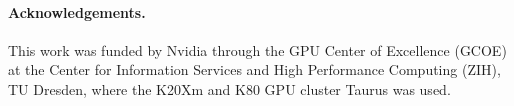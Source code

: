 
\paragraph{Acknowledgements.} This work was funded by Nvidia through the GPU Center of Excellence (GCOE) at the Center for Information Services and High Performance Computing (ZIH), TU Dresden, where the K20Xm and K80 GPU cluster Taurus was used.

